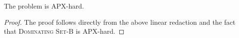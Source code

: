 \begin{theorem}
The \textsc{\CARPOOL{}} problem is APX-hard.
\end{theorem}

\begin{proof}
The proof follows directly from the above linear redaction and the fact that 
\textsc{Dominating Set-B} is APX-hard. 
\end{proof}